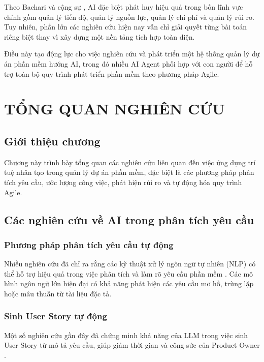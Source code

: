 \documentclass[12pt,a4paper]{report}
\begin{document}
Theo Bachari và cộng sự \cite{bachari2025}, AI đặc biệt phát huy hiệu quả trong bốn lĩnh vực chính gồm quản lý tiến độ, quản lý nguồn lực, quản lý chi phí và quản lý rủi ro. Tuy nhiên, phần lớn các nghiên cứu hiện nay vẫn chỉ giải quyết từng bài toán riêng biệt thay vì xây dựng một nền tảng tích hợp toàn diện.

Điều này tạo động lực cho việc nghiên cứu và phát triển một hệ thống quản lý dự án phần mềm hướng AI, trong đó nhiều AI Agent phối hợp với con người để hỗ trợ toàn bộ quy trình phát triển phần mềm theo phương pháp Agile.


\chapter{TỔNG QUAN NGHIÊN CỨU}
\label{chap:related_work}

\section{Giới thiệu chương}

Chương này trình bày tổng quan các nghiên cứu liên quan đến việc ứng dụng trí tuệ nhân tạo trong quản lý dự án phần mềm, đặc biệt là các phương pháp phân tích yêu cầu, ước lượng công việc, phát hiện rủi ro và tự động hóa quy trình Agile.
\section{Các nghiên cứu về AI trong phân tích yêu cầu}

\subsection{Phương pháp phân tích yêu cầu tự động}

Nhiều nghiên cứu đã chỉ ra rằng các kỹ thuật xử lý ngôn ngữ tự nhiên (NLP) có thể hỗ trợ hiệu quả trong việc phân tích và làm rõ yêu cầu phần mềm \cite{bachari2025}. Các mô hình ngôn ngữ lớn hiện đại có khả năng phát hiện các yêu cầu mơ hồ, trùng lặp hoặc mâu thuẫn từ tài liệu đặc tả.

\subsection{Sinh User Story tự động}

Một số nghiên cứu gần đây đã chứng minh khả năng của LLM trong việc sinh User Story từ mô tả yêu cầu, giúp giảm thời gian và công sức của Product Owner \cite{vaswani2017attention}.
\end{document}

